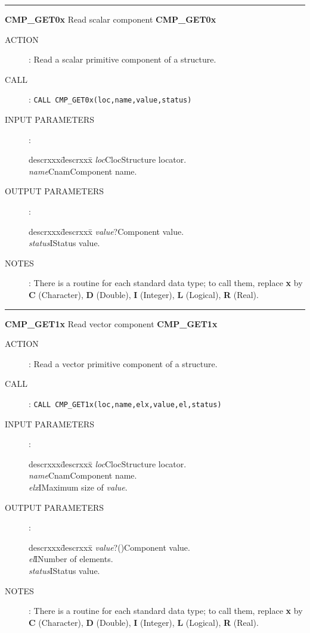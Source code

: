 \newpage
\small
\rule{\textwidth}{0.3mm}
{\Large {\bf CMP\_GET0x} \hfill Read scalar component \hfill {\bf CMP\_GET0x}}
\begin{description}
\item [ACTION]:
Read a scalar primitive component of a structure.
\item [CALL]:
{\tt CALL CMP\_GET0x(loc,name,value,status)}
\item [INPUT PARAMETERS]:
\begin{tabbing}
descrxxx\=descrxxx\=\kill
{\em loc}\>Cloc\>Structure locator.\\
{\em name}\>Cnam\>Component name.
\end{tabbing}
\item [OUTPUT PARAMETERS]:
\begin{tabbing}
descrxxx\=descrxxx\=\kill
{\em value}\>?\>Component value.\\
{\em status}\>I\>Status value.
\end{tabbing}
\item [NOTES]:
There is a routine for each standard data type; to call them, replace {\bf x}
by {\bf C} (Character), {\bf D} (Double), {\bf I} (Integer), {\bf L} (Logical),
{\bf R} (Real).
\end{description}
\goodbreak
\rule{\textwidth}{0.3mm}
{\Large {\bf CMP\_GET1x} \hfill Read vector component \hfill {\bf CMP\_GET1x}}
\begin{description}
\item [ACTION]:
Read a vector primitive component of a structure.
\item [CALL]:
{\tt CALL CMP\_GET1x(loc,name,elx,value,el,status)}
\item [INPUT PARAMETERS]:
\begin{tabbing}
descrxxx\=descrxxx\=\kill
{\em loc}\>Cloc\>Structure locator.\\
{\em name}\>Cnam\>Component name.\\
{\em elx}\>I\>Maximum size of {\em value}.
\end{tabbing}
\item [OUTPUT PARAMETERS]:
\begin{tabbing}
descrxxx\=descrxxx\=\kill
{\em value}\>?()\>Component value.\\
{\em el}\>I\>Number of elements.\\
{\em status}\>I\>Status value.
\end{tabbing}
\item [NOTES]:
There is a routine for each standard data type; to call them, replace {\bf x}
by {\bf C} (Character), {\bf D} (Double), {\bf I} (Integer), {\bf L} (Logical),
{\bf R} (Real).
\end{description}
